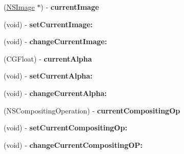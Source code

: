 \begin{DoxyCompactItemize}
\item 
\hypertarget{interface_p_a_d_simple_image_view_a188373d8853f04019ca84a1e156fa6b7}{
(\hyperlink{class_n_s_image}{NSImage} $\ast$) -\/ {\bfseries currentImage}}
\label{interface_p_a_d_simple_image_view_a188373d8853f04019ca84a1e156fa6b7}

\item 
\hypertarget{interface_p_a_d_simple_image_view_a31e2095e131924257a56bd687a2f906c}{
(void) -\/ {\bfseries setCurrentImage:}}
\label{interface_p_a_d_simple_image_view_a31e2095e131924257a56bd687a2f906c}

\item 
\hypertarget{interface_p_a_d_simple_image_view_ac94251597976225b87f5ea20328dc753}{
(void) -\/ {\bfseries changeCurrentImage:}}
\label{interface_p_a_d_simple_image_view_ac94251597976225b87f5ea20328dc753}

\item 
\hypertarget{interface_p_a_d_simple_image_view_ae0ec1e71c46857301ceb6b0f1edc08b4}{
(CGFloat) -\/ {\bfseries currentAlpha}}
\label{interface_p_a_d_simple_image_view_ae0ec1e71c46857301ceb6b0f1edc08b4}

\item 
\hypertarget{interface_p_a_d_simple_image_view_ad07890bf8a8ffe05a80fc1a4f34ea37c}{
(void) -\/ {\bfseries setCurrentAlpha:}}
\label{interface_p_a_d_simple_image_view_ad07890bf8a8ffe05a80fc1a4f34ea37c}

\item 
\hypertarget{interface_p_a_d_simple_image_view_a661bdc3fb50bf7407b991dc59b397aa4}{
(void) -\/ {\bfseries changeCurrentAlpha:}}
\label{interface_p_a_d_simple_image_view_a661bdc3fb50bf7407b991dc59b397aa4}

\item 
\hypertarget{interface_p_a_d_simple_image_view_aa7731cca99b0e12449b2430df50bedad}{
(NSCompositingOperation) -\/ {\bfseries currentCompositingOp}}
\label{interface_p_a_d_simple_image_view_aa7731cca99b0e12449b2430df50bedad}

\item 
\hypertarget{interface_p_a_d_simple_image_view_a3a31216acef36e95f13376fc789b845d}{
(void) -\/ {\bfseries setCurrentCompositingOp:}}
\label{interface_p_a_d_simple_image_view_a3a31216acef36e95f13376fc789b845d}

\item 
\hypertarget{interface_p_a_d_simple_image_view_a09f9d1cc301e28483ecda4b8bfaddbf6}{
(void) -\/ {\bfseries changeCurrentCompositingOP:}}
\label{interface_p_a_d_simple_image_view_a09f9d1cc301e28483ecda4b8bfaddbf6}


\end{DoxyCompactItemize}
